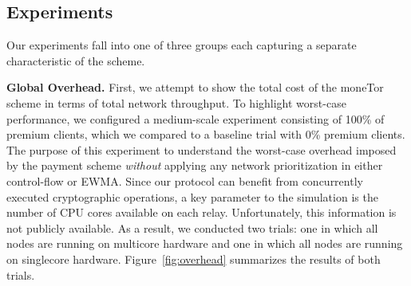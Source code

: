 \subsection{Experiments}

\label{subsec:experiments} Our experiments fall into one of three groups each capturing a separate characteristic of the scheme.

\medskip \noindent \textbf{Global Overhead.}
First, we attempt to show the total cost of the moneTor scheme in terms of total network throughput.
To highlight worst-case performance, we configured a medium-scale experiment consisting of 100\% of premium clients, which we compared to a baseline trial with 0\% premium clients.
The purpose of this experiment to understand the worst-case overhead imposed by the payment scheme \emph{without} applying any network prioritization in either control-flow or EWMA.
Since our protocol can benefit from concurrently executed cryptographic operations, a key parameter to the simulation is the number of CPU cores available on each relay.
Unfortunately, this information is not publicly available.
As a result, we conducted two trials: one in which all nodes are running on multicore hardware and one in which all nodes are running on singlecore hardware.
Figure~\ref{fig:overhead} summarizes the results of both trials.

